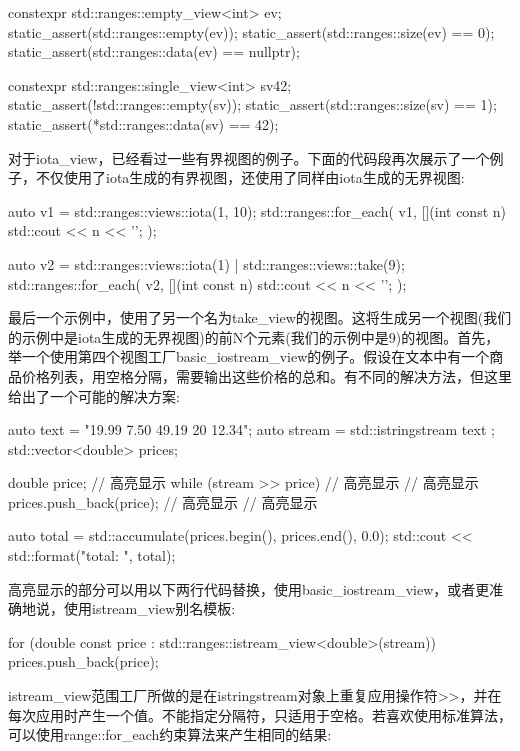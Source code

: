 \begin{cpp}
constexpr std::ranges::empty_view<int> ev;
static_assert(std::ranges::empty(ev));
static_assert(std::ranges::size(ev) == 0);
static_assert(std::ranges::data(ev) == nullptr);

constexpr std::ranges::single_view<int> sv{42};
static_assert(!std::ranges::empty(sv));
static_assert(std::ranges::size(sv) == 1);
static_assert(*std::ranges::data(sv) == 42);
\end{cpp}

对于iota\_view，已经看过一些有界视图的例子。下面的代码段再次展示了一个例子，不仅使用了iota生成的有界视图，还使用了同样由iota生成的无界视图:

\begin{cpp}
auto v1 = std::ranges::views::iota(1, 10);
std::ranges::for_each(
	v1,
	[](int const n) {std::cout << n << '\n'; });
	
auto v2 = std::ranges::views::iota(1) |
		  std::ranges::views::take(9);
std::ranges::for_each(
	v2,
	[](int const n) {std::cout << n << '\n'; });
\end{cpp}

最后一个示例中，使用了另一个名为take\_view的视图。这将生成另一个视图(我们的示例中是iota生成的无界视图)的前N个元素(我们的示例中是9)的视图。首先，举一个使用第四个视图工厂basic\_iostream\_view的例子。假设在文本中有一个商品价格列表，用空格分隔，需要输出这些价格的总和。有不同的解决方法，但这里给出了一个可能的解决方案:

\begin{cpp}
auto text = "19.99 7.50 49.19 20 12.34";
auto stream = std::istringstream{ text };
std::vector<double> prices;

double price; // 高亮显示
while (stream >> price) // 高亮显示
{ // 高亮显示
	prices.push_back(price); // 高亮显示
} // 高亮显示

auto total = std::accumulate(prices.begin(), prices.end(),
							 0.0);
std::cout << std::format("total: {}\n", total);
\end{cpp}

高亮显示的部分可以用以下两行代码替换，使用basic\_iostream\_view，或者更准确地说，使用istream\_view别名模板:

\begin{cpp}
for (double const price :
		std::ranges::istream_view<double>(stream))
{
	prices.push_back(price);
}
\end{cpp}

istream\_view范围工厂所做的是在istringstream对象上重复应用操作符>{}>，并在每次应用时产生一个值。不能指定分隔符，只适用于空格。若喜欢使用标准算法，可以使用range::for\_each约束算法来产生相同的结果:

